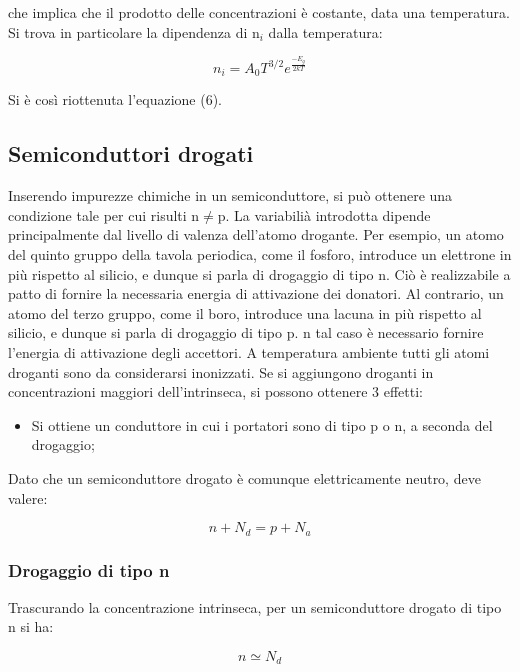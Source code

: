 \documentclass{article}
\begin{document}
che implica che il prodotto delle concentrazioni è costante, data una temperatura.
Si trova in particolare la dipendenza di n$_i$ dalla temperatura:

\begin{equation}
    n_i = A_0 T^{3/2} e^{\frac{-E_g}{2kT}}
\end{equation}

Si è così riottenuta l'equazione (6).

\subsection{Semiconduttori drogati}
Inserendo impurezze chimiche in un semiconduttore, si può ottenere una condizione tale per cui risulti n$\neq$p.
La variabilià introdotta dipende principalmente dal livello di valenza dell'atomo drogante.
Per esempio, un atomo del quinto gruppo della tavola periodica, come il fosforo, introduce un elettrone in più rispetto al silicio, e dunque si parla di drogaggio di tipo n.
Ciò è realizzabile a patto di fornire la necessaria energia di attivazione dei donatori.
Al contrario, un atomo del terzo gruppo, come il boro, introduce una lacuna in più rispetto al silicio, e dunque si parla di drogaggio di tipo p.
n tal caso è necessario fornire l'energia di attivazione degli accettori.
A temperatura ambiente tutti gli atomi droganti sono da considerarsi inonizzati.
Se si aggiungono droganti in concentrazioni maggiori dell'intrinseca, si possono ottenere 3 effetti:

\begin{itemize}
\item Si ottiene un conduttore in cui i portatori sono di tipo p o n, a seconda del drogaggio;
\end{itemize}

Dato che un semiconduttore drogato è comunque elettricamente neutro, deve valere:

\begin{equation}
    n + N_d = p + N_a
\end{equation}

\subsubsection{Drogaggio di tipo n}

Trascurando la concentrazione intrinseca, per un semiconduttore drogato di tipo n si ha:

\begin{equation}
    n \simeq N_d
\end{equation}
\end{document}
